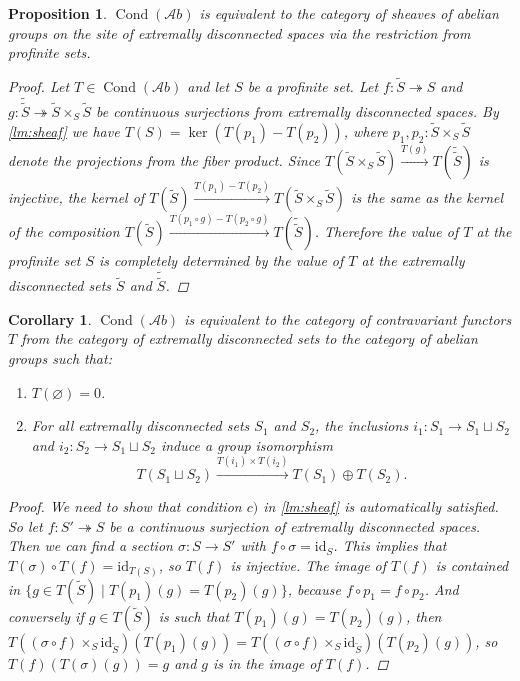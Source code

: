 \documentclass[11pt,A4]{article}
\theoremstyle{plain}
\newtheorem{prop}[thm]{Proposition}
\newtheorem{cor}[thm]{Corollary}
\theoremstyle{definition}
\theoremstyle{remark}
\newcommand{\1}{\mathbbm{1}}
\newcommand{\Ab}{\mathscr{A}b}
\DeclareMathOperator{\Cond}{Cond}
\newcommand{\op}{\oplus}
\newcommand{\fp}[1]{\times_{#1}}
\newcommand{\id}{\mathrm{id}}
\begin{document}
\begin{prop}
    $\Cond(\Ab)$ is equivalent to the category of sheaves of abelian groups on the site of extremally disconnected spaces via the restriction from profinite sets.
    \begin{proof}
	Let $T\in \Cond(\Ab)$ and let $S$ be a profinite set.
	Let $f\colon \tilde{S}\twoheadrightarrow S$ and $g\colon \tilde{\tilde{S}}\twoheadrightarrow \tilde{S}\fp{S}\tilde{S}$ be continuous surjections from extremally disconnected spaces.
	By \cref{lm:sheaf} we have $T(S)=\ker(T(p_{1})-T(p_{2}))$, where $p_{1},p_{2}\colon \tilde{S}\fp{S}\tilde{S}$ denote the projections from the fiber product.
	Since $T(\tilde{S}\fp{S}\tilde{S})\xrightarrow{T(g)} T(\tilde{\tilde{S}})$ is injective, the kernel of $T(\tilde{S})\xrightarrow{T(p_{1})-T(p_{2})} T(\tilde{S}\fp{S}\tilde{S})$ is the same as the kernel of the composition $T(\tilde{S})\xrightarrow{T(p_{1}\circ g)-T(p_{2}\circ g)} T(\tilde{\tilde{S}})$.
	Therefore the value of $T$ at the profinite set $S$ is completely determined by the value of $T$ at the extremally disconnected sets $\tilde{S}$ and $\tilde{\tilde{S}}$.
    \end{proof}
\end{prop}

\begin{cor}\label{cor:sheaf}
    $\Cond(\Ab)$ is equivalent to the category of contravariant functors $T$ from the category of extremally disconnected sets to the category of abelian groups such that:
    \begin{enumerate}[label=\alph*)]
	\item $T(\varnothing)=0$.
	\item For all extremally disconnected sets $S_{1}$ and $S_{2}$, the inclusions $i_{1}\colon S_{1}\to S_{1}\sqcup S_{2}$ and $i_{2}\colon S_{2}\to S_{1}\sqcup S_{2}$ induce a group isomorphism
	    \[ T(S_{1}\sqcup S_{2})\xrightarrow{T(i_{1})\times T(i_{2})} T(S_{1})\op T(S_{2}).\]
    \end{enumerate}
    \begin{proof}
	We need to show that condition $c)$ in \cref{lm:sheaf} is automatically satisfied.
	So let $f\colon S'\twoheadrightarrow S$ be a continuous surjection of extremally disconnected spaces.
	Then we can find a section $\sigma\colon S\to S'$ with $f\circ \sigma =\id_{S}$.
	This implies that $T(\sigma)\circ T(f)=\id_{T(S)}$, so $T(f)$ is injective.
	The image of $T(f)$ is contained in $\{ g\in T(\tilde{S})\mid T(p_{1})(g)=T(p_{2})(g)\}$, because $f\circ p_{1}=f\circ p_{2}$.
	And conversely if $g\in T(\tilde{S})$ is such that $T(p_{1})(g)=T(p_{2})(g)$, then $T((\sigma \circ f)\fp{S}\id_{\tilde{S}})(T(p_{1})(g))=T((\sigma \circ f)\fp{S}\id_{\tilde{S}})(T(p_{2})(g))$, so $T(f)(T(\sigma)(g))=g$ and $g$ is in the image of $T(f)$.
    \end{proof}
\end{cor}
\end{document}
